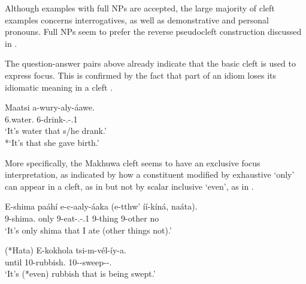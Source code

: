 \documentclass[output=paper]{langscibook}
\begin{document}
\z

Although examples with full NPs are accepted, the large majority of cleft examples concerns interrogatives, as well as demonstrative and personal pronouns. Full NPs seem to prefer the reverse pseudocleft construction discussed in .

The question-answer pairs above already indicate that the basic cleft is used to express focus. This is confirmed by the fact that part of an idiom loses its idiomatic meaning in a cleft .

\ea
\label{bkm:Ref110335301}
\gll
Maatsi  a-wury-aly-áawe.\\
6.water.\PRL{}  6-drink-\PFV{}.\REL{}-\POSS{}.1\\
\glt ‘It’s water that s/he drank.’\\
*`It’s that she gave birth.’


\z

More specifically, the Makhuwa cleft seems to have an exclusive focus interpretation, as indicated by how a constituent modified by exhaustive ‘only’ can appear in a cleft, as in  but not by scalar inclusive ‘even’, as in . 

\ea
\label{bkm:Ref96954945}
\gll
E-shima  paáhí  e-c-aaly-áaka  (e-tthw’  íí-kíná,  naáta).\\
9-shima.\PRL{}  only  9-eat-\PFV{}.\REL{}-\POSS{}.1\SG{}  {\db}9-thing  9-other  no\\
\glt
‘It’s only shima that I ate (other things not).’\\

\z

\ea
\label{bkm:Ref109583490}
\gll
(*Hata)  E-kokhola  tsi-m-vél-íy-a.\\
until  10-rubbish.\PRL{}  10-\PRS{}-sweep-\PASS{}-\FV{}.\REL{}\\
\glt
‘It’s (*even) rubbish that is being swept.’\\

\z
\end{document}
